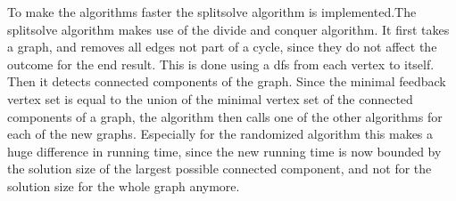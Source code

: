 To make the algorithms faster the splitsolve algorithm is implemented.The splitsolve algorithm makes use of the divide and conquer algorithm. It first takes a graph, and removes all edges not part of a cycle, since they do not affect the outcome for the end result. This is done using a dfs from each vertex to itself. Then it detects connected components of the graph. Since the minimal feedback vertex set is equal to the union of the minimal vertex set of the connected components of a graph, the algorithm then calls one of the other algorithms for each of the new graphs. Especially for the randomized algorithm this makes a huge difference in running time, since the new running time is now bounded by the solution size of the largest possible connected component, and not for the solution size for the whole graph anymore. 